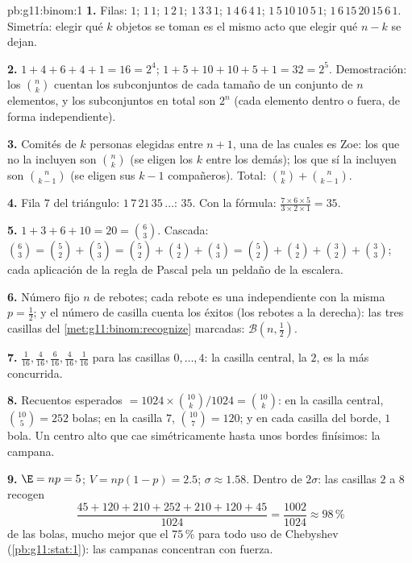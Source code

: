 \begin{solution}{pb:g11:binom:1}
\textbf{1.} Filas: $1$; $1\,1$; $1\,2\,1$; $1\,3\,3\,1$;
$1\,4\,6\,4\,1$; $1\,5\,10\,10\,5\,1$; $1\,6\,15\,20\,15\,6\,1$.
Simetría: elegir qué $k$ objetos se toman es el mismo acto que elegir qué
$n - k$ se dejan.

\textbf{2.} $1 + 4 + 6 + 4 + 1 = 16 = 2^4$;
$1 + 5 + 10 + 10 + 5 + 1 = 32 = 2^5$. Demostración: los $\binom nk$
cuentan los subconjuntos de cada tamaño de un conjunto de $n$ elementos, y
los subconjuntos en total son $2^n$ (cada elemento dentro o fuera, de
forma independiente).

\textbf{3.} Comités de $k$ personas elegidas entre $n + 1$, una de las
cuales es Zoe: los que no la incluyen son $\binom nk$ (se eligen los $k$
entre los demás); los que sí la incluyen son $\binom{n}{k-1}$ (se eligen
sus $k - 1$ compañeros). Total: $\binom nk + \binom{n}{k-1}$.

\textbf{4.} Fila $7$ del triángulo: $1\,7\,21\,35\,\dots$: $35$. Con la
fórmula: $\frac{7 \times 6 \times 5}{3 \times 2 \times 1} = 35$.

\textbf{5.} $1 + 3 + 6 + 10 = 20 = \binom63$. Cascada:
$\binom63 = \binom52 + \binom53 = \binom52 + \binom42 + \binom43 =
\binom52 + \binom42 + \binom32 + \binom33$; cada aplicación de la regla de
Pascal pela un peldaño de la escalera.

\textbf{6.} Número fijo $n$ de rebotes; cada rebote es una  independiente con la misma $p = \frac12$; y el número de casilla
cuenta los éxitos (los rebotes a la derecha): las tres casillas del
\cref{met:g11:binom:recognize} marcadas:
$\mathcal B\!\left(n, \frac12\right)$.

\textbf{7.}  $\frac{1}{16}, \frac{4}{16}, \frac{6}{16},
\frac{4}{16}, \frac{1}{16}$ para las casillas $0, \dots, 4$: la casilla
central, la $2$, es la más concurrida.

\textbf{8.} Recuentos esperados $= 1024 \times \binom{10}{k}/1024 =
\binom{10}{k}$: en la casilla central, $\binom{10}{5} = 252$ bolas; en la
casilla $7$, $\binom{10}{7} = 120$; y en cada casilla del borde, $1$ bola.
Un centro alto que cae simétricamente hasta unos bordes finísimos: la
campana.

\textbf{9.} $\E = np = 5$; $V = np(1 - p) = 2.5$; $\sigma \approx 1.58$.
Dentro de $2\sigma$: las casillas $2$ a $8$ recogen
\[
\frac{45 + 120 + 210 + 252 + 210 + 120 + 45}{1024}
= \frac{1002}{1024} \approx 98\,\%
\]
de las bolas, mucho mejor que el $75\,\%$ para todo uso de Chebyshev
(\cref{pb:g11:stat:1}): las campanas concentran con fuerza.


\end{solution}
